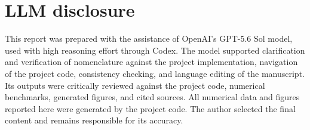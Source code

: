 \documentclass[11pt]{article}
\author{
    \textit{\Large\AuthorName}\\[4pt]
    \textit{\Large[ \AuthorNumber\ ]}\\
    \\ \\
    \textit{\Large Supervisor:\ \Supervisor}
}
\date{}
\title{
	\vspace{0.2\textheight}
	\textbf{\Huge\Class} \\ 
	\vspace{10pt}
	\textbf{\LARGE\Title} \\ 
	\vspace{10pt}
	\textbf{\Large\subtitle}
	\vspace{10pt}
}
\numberwithin{equation}{section}
\begin{document}
\maketitle
\thispagestyle{firstpage}
\newpage
\tableofcontents


\section*{LLM disclosure}
\par
This report was prepared with the assistance of OpenAI's GPT-5.6 Sol model,
used with high reasoning effort through Codex. The model supported
clarification and verification of nomenclature against the project implementation,
navigation of the project code, consistency checking, and language editing of the manuscript. Its outputs were critically reviewed against the
project code, numerical benchmarks, generated figures, and cited sources.
All numerical data and figures reported here were generated by the project code.
The author selected the final content and remains responsible for its accuracy.


\newpage





\clearpage
\appendix


\newpage


\end{document}
